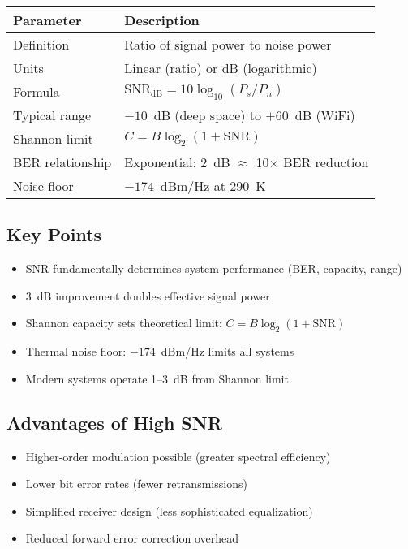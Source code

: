 \begin{center}
\begin{tabular}{ll}
\toprule
\textbf{Parameter} & \textbf{Description} \\
\midrule
Definition & Ratio of signal power to noise power \\
Units & Linear (ratio) or dB (logarithmic) \\
Formula & $\mathrm{SNR_{dB}} = 10\log_{10}(P_s/P_n)$ \\
Typical range & $-10$~dB (deep space) to $+60$~dB (WiFi) \\
Shannon limit & $C = B\log_2(1 + \mathrm{SNR})$ \\
BER relationship & Exponential: 2~dB $\approx$ 10$\times$ BER reduction \\
Noise floor & $-174$~dBm/Hz at 290~K \\
\bottomrule
\end{tabular}
\end{center}

\subsection*{Key Points}

\begin{itemize}
\item SNR fundamentally determines system performance (BER, capacity, range)
\item 3~dB improvement doubles effective signal power
\item Shannon capacity sets theoretical limit: $C = B\log_2(1 + \mathrm{SNR})$
\item Thermal noise floor: $-174$~dBm/Hz limits all systems
\item Modern systems operate 1--3~dB from Shannon limit
\end{itemize}

\subsection*{Advantages of High SNR}

\begin{itemize}
\item Higher-order modulation possible (greater spectral efficiency)
\item Lower bit error rates (fewer retransmissions)
\item Simplified receiver design (less sophisticated equalization)
\item Reduced forward error correction overhead
\end{itemize}

